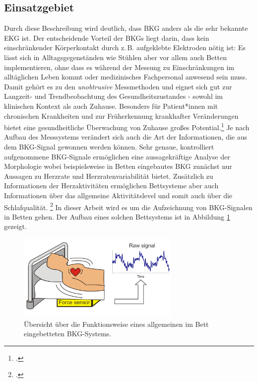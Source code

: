 	\subsection{Einsatzgebiet}
	
	Durch diese Beschreibung wird deutlich, dass \ac{BKG} anders als die sehr bekannte \ac{EKG} ist. Der entscheidende Vorteil der \ac{BKG}s liegt darin, dass kein einschränkender Körperkontakt durch z.\,B. aufgeklebte Elektroden nötig ist: Es lässt sich in Alltagsgegenständen wie Stühlen aber vor allem auch Betten implementieren, ohne dass es während der Messung zu Einschränkungen im alltäglichen Leben kommt oder medizinisches Fachpersonal anwesend sein muss. Damit gehört es zu den \textit{unobtrusive} Messmethoden und eignet sich gut zur Langzeit- und Trendbeobachtung des Gesundheitszustandes - sowohl im klinischen Kontext als auch Zuhause. Besonders für Patient*innen mit chronischen Krankheiten und zur Früherkennung krankhafter Veränderungen bietet eine gesundheitliche Überwachung von Zuhause großes Potential.\footcite[Vgl.][]{Inan2015} Je nach Aufbau des Messsystems verändert sich auch die Art der Informationen, die aus dem \ac{BKG}-Signal gewonnen werden können. Sehr genaue, kontrolliert aufgenommene \ac{BKG}-Signale ermöglichen eine aussagekräftige Analyse der Morphologie wobei beispielsweise in Betten eingebautes \ac{BKG} zunächst nur Aussagen zu Herzrate und Herzratenvariabilität bietet. Zusätzlich zu Informationen der Herzaktivitäten ermöglichen Bettsysteme aber auch Informationen über das allgemeine Aktivitätslevel und somit auch über die Schlafqualität. \footcite[Vgl.][]{Bruser2011} In dieser Arbeit wird es um die Aufzeichnung von \ac{BKG}-Signalen in Betten gehen. Der Aufbau eines solchen Bettsystems ist in Abbildung \ref{fig:bcgbed} gezeigt.
	
	 \begin{figure}[H]
	 	\centering
		\includegraphics[width=0.7\textwidth]{pic/bcgBed.png}
		\caption[Übersicht über die Funktionsweise eines allgemeinen im Bett eingebetteten \ac{BKG}-Systems]{Übersicht über die Funktionsweise eines allgemeinen im Bett eingebetteten \ac{BKG}-Systems.\protect\footnotemark}
		\label{fig:bcgbed}
	\end{figure}
	
